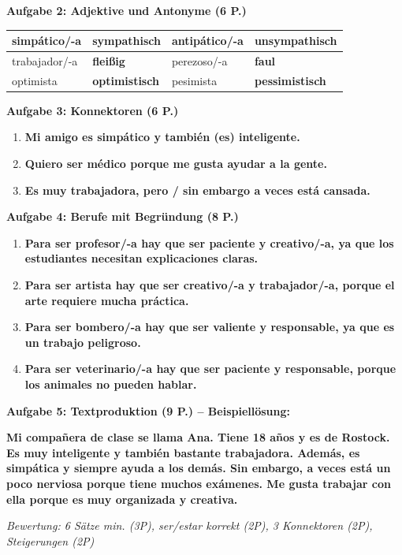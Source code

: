 \documentclass[11pt,a4paper]{article}
\newcommand{\lsg}[1]{\textcolor{loesung}{\textbf{#1}}}
\begin{document}
\begin{gruppeBbox}
\vspace{0.5em}

\textbf{Aufgabe 2: Adjektive und Antonyme (6 P.)}

\begin{tabularx}{\textwidth}{@{}|X|X|X|X|@{}}
\hline
simpático/-a & \lsg{sympathisch} & antipático/-a & \lsg{unsympathisch} \\
\hline
trabajador/-a & \lsg{fleißig} & perezoso/-a & \lsg{faul} \\
\hline
optimista & \lsg{optimistisch} & pesimista & \lsg{pessimistisch} \\
\hline
\end{tabularx}

\vspace{0.5em}

\textbf{Aufgabe 3: Konnektoren (6 P.)}
\begin{enumerate}[label=\alph*), leftmargin=2em, nosep]
    \item \lsg{Mi amigo es simpático y también (es) inteligente.}
    \item \lsg{Quiero ser médico porque me gusta ayudar a la gente.}
    \item \lsg{Es muy trabajadora, pero / sin embargo a veces está cansada.}
\end{enumerate}

\vspace{0.5em}

\textbf{Aufgabe 4: Berufe mit Begründung (8 P.)}
\begin{enumerate}[label=\alph*), leftmargin=2em, nosep]
    \item \lsg{Para ser profesor/-a hay que ser paciente y creativo/-a, ya que los estudiantes necesitan explicaciones claras.}
    \item \lsg{Para ser artista hay que ser creativo/-a y trabajador/-a, porque el arte requiere mucha práctica.}
    \item \lsg{Para ser bombero/-a hay que ser valiente y responsable, ya que es un trabajo peligroso.}
    \item \lsg{Para ser veterinario/-a hay que ser paciente y responsable, porque los animales no pueden hablar.}
\end{enumerate}

\vspace{0.5em}

\textbf{Aufgabe 5: Textproduktion (9 P.) -- Beispiellösung:}

\lsg{Mi compañera de clase se llama Ana. Tiene 18 años y es de Rostock. Es muy inteligente y también bastante trabajadora. Además, es simpática y siempre ayuda a los demás. Sin embargo, a veces está un poco nerviosa porque tiene muchos exámenes. Me gusta trabajar con ella porque es muy organizada y creativa.}

\vspace{0.3em}
\textit{\textcolor{grau}{Bewertung: 6 Sätze min. (3P), ser/estar korrekt (2P), 3 Konnektoren (2P), Steigerungen (2P)}}

\end{gruppeBbox}
\end{document}
